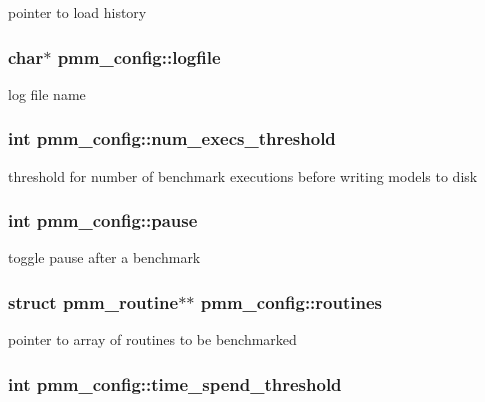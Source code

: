 pointer to load history \hypertarget{structpmm__config_aa4ca1ea92866a6c4e110c5c96aee1fc1}{
\subsubsection[{logfile}]{\setlength{\rightskip}{0pt plus 5cm}char$\ast$ pmm\-\_\-config\-::logfile}}\label{structpmm__config_aa4ca1ea92866a6c4e110c5c96aee1fc1}
log file name \hypertarget{structpmm__config_a187f80fecd42c473e4b923922fdd5bc8}{
\subsubsection[{num\-\_\-execs\-\_\-threshold}]{\setlength{\rightskip}{0pt plus 5cm}int pmm\-\_\-config\-::num\-\_\-execs\-\_\-threshold}}\label{structpmm__config_a187f80fecd42c473e4b923922fdd5bc8}
threshold for number of benchmark executions before writing models to disk \hypertarget{structpmm__config_a5a2660d8cdda3026735bb93d3a006ac4}{
\subsubsection[{pause}]{\setlength{\rightskip}{0pt plus 5cm}int pmm\-\_\-config\-::pause}}\label{structpmm__config_a5a2660d8cdda3026735bb93d3a006ac4}
toggle pause after a benchmark \hypertarget{structpmm__config_a0b090c1f848821392efcdd6fcc7b9063}{
\subsubsection[{routines}]{\setlength{\rightskip}{0pt plus 5cm}struct {\bf pmm\-\_\-routine}$\ast$$\ast$ pmm\-\_\-config\-::routines}}\label{structpmm__config_a0b090c1f848821392efcdd6fcc7b9063}
pointer to array of routines to be benchmarked \hypertarget{structpmm__config_a8c5e6f9a5a465bd3d7f8047905954e63}{
\subsubsection[{time\-\_\-spend\-\_\-threshold}]{\setlength{\rightskip}{0pt plus 5cm}int pmm\-\_\-config\-::time\-\_\-spend\-\_\-threshold}}\label{structpmm__config_a8c5e6f9a5a465bd3d7f8047905954e63}
